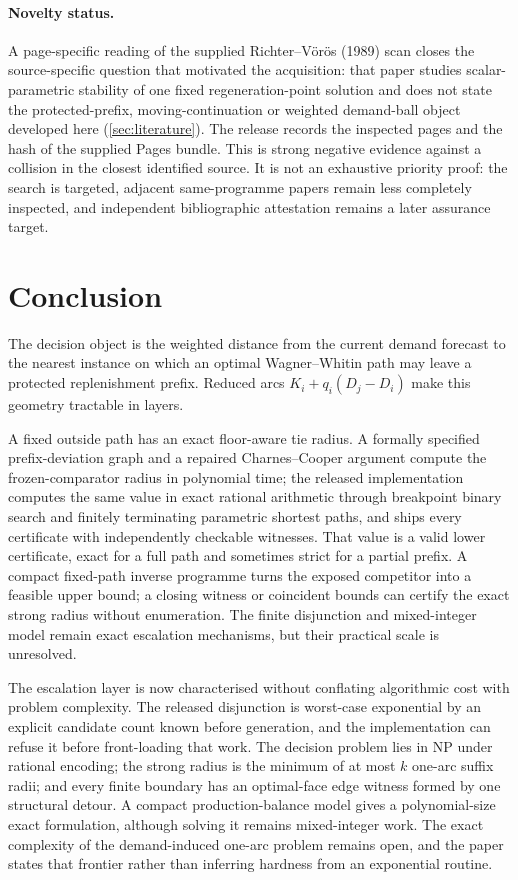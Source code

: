 \documentclass[11pt]{article}
\theoremstyle{definition}
\begin{document}
\paragraph{Novelty status.}
A page-specific reading of the supplied Richter--V{\"o}r{\"o}s (1989) scan closes the source-specific question that motivated the acquisition: that paper studies scalar-parametric stability of one fixed regeneration-point solution and does not state the protected-prefix, moving-continuation or weighted demand-ball object developed here (\cref{sec:literature}). The release records the inspected pages and the hash of the supplied Pages bundle. This is strong negative evidence against a collision in the closest identified source. It is not an exhaustive priority proof: the search is targeted, adjacent same-programme papers remain less completely inspected, and independent bibliographic attestation remains a later assurance target.

\section{Conclusion}

The decision object is the weighted distance from the current demand forecast to the nearest instance on which an optimal Wagner--Whitin path may leave a protected replenishment prefix. Reduced arcs $K_i+q_i(D_j-D_i)$ make this geometry tractable in layers.

A fixed outside path has an exact floor-aware tie radius. A formally specified prefix-deviation graph and a repaired Charnes--Cooper argument compute the frozen-comparator radius in polynomial time; the released implementation computes the same value in exact rational arithmetic through breakpoint binary search and finitely terminating parametric shortest paths, and ships every certificate with independently checkable witnesses. That value is a valid lower certificate, exact for a full path and sometimes strict for a partial prefix. A compact fixed-path inverse programme turns the exposed competitor into a feasible upper bound; a closing witness or coincident bounds can certify the exact strong radius without enumeration. The finite disjunction and mixed-integer model remain exact escalation mechanisms, but their practical scale is unresolved.

The escalation layer is now characterised without conflating algorithmic cost with problem complexity. The released disjunction is worst-case exponential by an explicit candidate count known before generation, and the implementation can refuse it before front-loading that work. The decision problem lies in NP under rational encoding; the strong radius is the minimum of at most $k$ one-arc suffix radii; and every finite boundary has an optimal-face edge witness formed by one structural detour. A compact production-balance model gives a polynomial-size exact formulation, although solving it remains mixed-integer work. The exact complexity of the demand-induced one-arc problem remains open, and the paper states that frontier rather than inferring hardness from an exponential routine.
\end{document}
